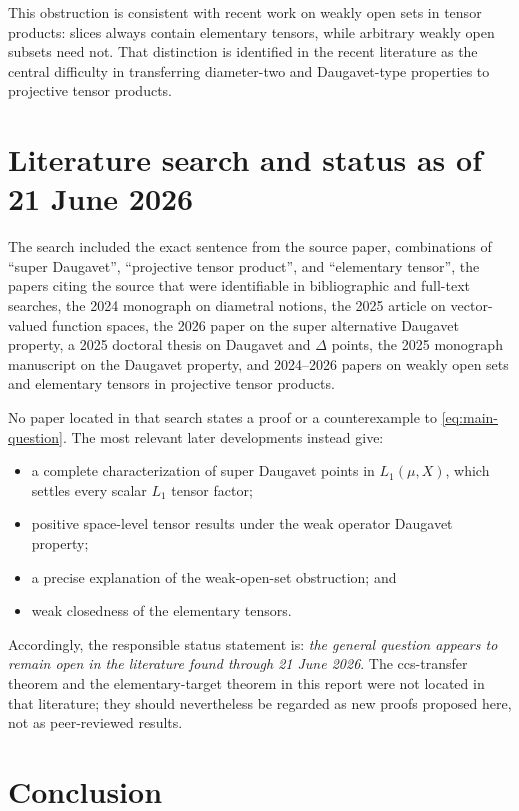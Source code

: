 \documentclass[11pt]{article}
\theoremstyle{definition}
\begin{document}
This obstruction is consistent with recent work on weakly open sets in tensor
products: slices always contain elementary tensors, while arbitrary weakly
open subsets need not.  That distinction is identified in the recent
literature as the central difficulty in transferring diameter-two and
Daugavet-type properties to projective tensor products.

\section{Literature search and status as of 21 June 2026}

The search included the exact sentence from the source paper, combinations of
``super Daugavet'', ``projective tensor product'', and ``elementary tensor'',
the papers citing the source that were identifiable in bibliographic and
full-text searches, the 2024 monograph on diametral notions, the 2025 article
on vector-valued function spaces, the 2026 paper on the super alternative
Daugavet property, a 2025 doctoral thesis on Daugavet and $\Delta$ points, the
2025 monograph manuscript on the Daugavet property, and 2024--2026 papers on
weakly open sets and elementary tensors in projective tensor products.

No paper located in that search states a proof or a counterexample to
\eqref{eq:main-question}.  The most relevant later developments instead give:
\begin{itemize}[leftmargin=1.8em]
\item a complete characterization of super Daugavet points in
      $L_1(\mu,X)$, which settles every scalar $L_1$ tensor factor;
\item positive space-level tensor results under the weak operator Daugavet
      property;
\item a precise explanation of the weak-open-set obstruction; and
\item weak closedness of the elementary tensors.
\end{itemize}
Accordingly, the responsible status statement is: \emph{the general question
appears to remain open in the literature found through 21 June 2026}.  The
ccs-transfer theorem and the elementary-target theorem in this report were not
located in that literature; they should nevertheless be regarded as new
proofs proposed here, not as peer-reviewed results.

\section{Conclusion}
\end{document}
